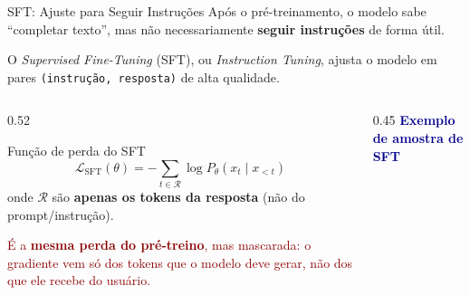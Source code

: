 \documentclass[aspectratio=169, xcolor=dvipsnames]{beamer}
\begin{document}
  \begin{frame}{SFT: Ajuste para Seguir Instruções}
        Após o pré-treinamento, o modelo sabe ``completar texto'', mas não necessariamente \textbf{seguir instruções} de forma útil.
        
        \vspace{0.2em}
        
        O \textit{Supervised Fine-Tuning} (SFT), ou \textit{Instruction Tuning},
        ajusta o modelo em pares \texttt{(instrução, resposta)} de alta qualidade.
    \begin{columns}
      \begin{column}{0.52\textwidth}

        \vspace{0.2em}
        \begin{block}{Função de perda do SFT}
          \[
            \mathcal{L}_{\text{SFT}}(\theta) = -\sum_{t \in \mathcal{R}}
            \log P_\theta(x_t \mid x_{<t})
          \]
          onde $\mathcal{R}$ são \textbf{apenas os tokens da resposta}
          (não do prompt/instrução).
        \end{block}

        \textcolor{DarkRed}{\small É a \textbf{mesma perda do pré-treino}, mas mascarada: o gradiente vem só dos tokens que o modelo deve gerar, não dos que ele recebe do usuário.}
      \end{column}
      \begin{column}{0.45\textwidth}
        \textcolor{DarkBlue}{\textbf{Exemplo de amostra de SFT}}
        \vspace{0.3em}


\end{column}
\end{columns}
\end{frame}
\end{document}
